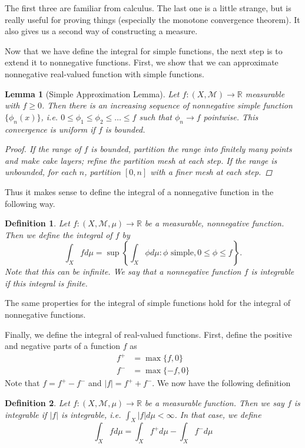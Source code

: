 \documentclass[10pt]{article}         %
\newtheorem{definition}{Definition}[section]
\newtheorem{lemma}{Lemma}[section]
\theoremstyle{remark}
\newcommand{\R}{\mathbb{R}}
\begin{document}
The first three are familiar from calculus. The last one is a little strange, but is really useful for proving things (especially the monotone convergence theorem). It also gives us a second way of constructing a measure.

Now that we have define the integral for simple functions, the next step is to extend it to nonnegative functions. First, we show that we can approximate nonnegative real-valued function with simple functions.

\begin{lemma}[Simple Approximation Lemma]
Let $f: (X,\mathcal{M}) \rightarrow \R$ measurable with $f \geq 0$. Then there is an increasing sequence of nonnegative simple function $\{ \phi_n(x) \} $, i.e. $0 \leq \phi_1 \leq \phi_2 \leq \dots \leq f$ such that $\phi_n \rightarrow f$ pointwise. This convergence is uniform if $f$ is bounded.
\begin{proof}
If the range of $f$ is bounded, partition the range into finitely many points and make cake layers; refine the partition mesh at each step. If the range is unbounded, for each $n$, partition $[0, n]$ with a finer mesh at each step.
\end{proof}
\end{lemma}

Thus it makes sense to define the integral of a nonnegative function in the following way.

\begin{definition}
Let $f:(X, \mathcal{M}, \mu) \rightarrow \R$ be a measurable, nonnegative function. Then we define the integral of $f$ by
\[
\int_X fd\mu =\sup\left\{ \int_X \phi d\mu : \phi \text{  simple}, 0\leq\phi\leq f \right\}.
\]
Note that this can be infinite. We say that a nonnegative function $f$ is integrable if this integral is finite.
\end{definition}
The same properties for the integral of simple functions hold for the integral of nonnegative functions.

Finally, we define the integral of real-valued functions. First, define the positive and negative parts of a function $f$ as 
\begin{align*}
f^+ &= \max\{f,0\} \\
f^- &= \max\{-f,0\}
\end{align*}
Note that $f = f^+ - f^-$ and $|f| = f^+ + f^-$. We now have the following definition 

\begin{definition}
Let $f:(X, \mathcal{M}, \mu) \rightarrow \R$ be a measurable function. Then we say $f$ is integrable if $|f|$ is integrable, i.e. $\int_X |f| d\mu < \infty$. In that case, we define
\[
\int_X f d\mu=\int_Xf^{+}d\mu-\int_Xf^-d\mu
\]
\end{definition}
\end{document}
